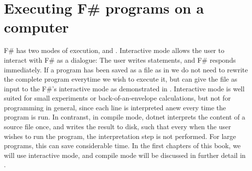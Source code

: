 \documentclass[springer.tex]{subfiles}
\begin{document}


\section{Executing F\# programs on a computer}

F\# has two modes of execution,  and . Interactive mode allows the user to interact with F\# as a dialogue: The user writes statements, and F\# responds immediately. If a program has been saved as a file as in  we do not need to rewrite the complete program everytime we wish to execute it, but can give the file as input to the F\#'s interactive mode as demonstrated in . Interactive mode is well suited for small experiments or back-of-an-envelope calculations, but not for programming in general, since each line is interpreted anew every time the program is run. In contranst, in compile mode, dotnet interprets the content of a source file once, and writes the result to disk, such that every when the user wishes to run the program, the interpretation step is not performed. For large programs, this can save considerable time. In the first chapters of this book, we will use interactive mode, and compile mode will be discussed in further detail in .
\end{document}
